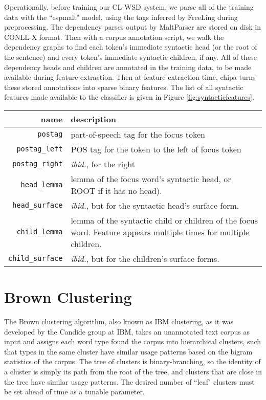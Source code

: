 Operationally, before training our CL-WSD system, we parse all of the training
data with the ``espmalt" model, using the tags inferred by FreeLing during
preprocessing. The dependency parses output by MaltParser are stored on disk in
CONLL-X format. Then with a corpus annotation script, we walk the dependency
graphs to find each token's immediate syntactic head (or the root of the
sentence) and every token's immediate syntactic children, if any. All of these
dependency heads and children are annotated in the training data, to be made
available during feature extraction. Then at feature extraction time, chipa
turns these stored annotations into sparse binary features. The list of all
syntactic features made available to the classifier is given in Figure
\ref{fig:syntacticfeatures}.

\begin{figure*}
  \begin{centering}
  \begin{tabular}{|r|p{11cm}|}
    \hline
    name          & description  \\
    \hline
    \texttt{postag}    & part-of-speech tag for the focus token \\
    \hline
    \texttt{postag\_left}  & POS tag for the token to the left of focus token \\
    \hline
    \texttt{postag\_right} & \emph{ibid.}, for the right \\
    \hline
    \texttt{head\_lemma} & lemma of the focus word's syntactic head, or ROOT if
    it has no head). \\
    \hline
    \texttt{head\_surface} & \emph{ibid.}, but for the syntactic head's surface
    form. \\
    \hline
    \texttt{child\_lemma} & lemma of the syntactic child or children of the
    focus word. Feature appears multiple times for multiple children. \\
    \hline
    \texttt{child\_surface} & \emph{ibid.}, but for the children's surface
    forms. \\
    \hline
  \end{tabular}
  \end{centering}
  \caption{Additional syntactic features}
  \label{fig:syntacticfeatures}
\end{figure*}

\section{Brown Clustering}
The Brown clustering algorithm\cite{brown1992class}, also known as IBM
clustering, as it was developed by the Candide group at IBM, takes an
unannotated text corpus as input and assigns each word type found the corpus
into hierarchical clusters, such that types in the same cluster have similar
usage patterns based on the bigram statistics of the corpus. The tree of
clusters is binary-branching, so the identity of a cluster is simply its path
from the root of the tree, and clusters that are close in the tree have similar
usage patterns. The desired number of ``leaf" clusters must be set ahead of
time as a tunable parameter.

